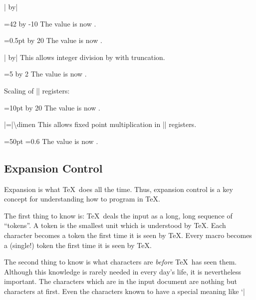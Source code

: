 \begin{command}{\multiply{}| by|}
\begin{codeexample}[]
=42
\multiply{} by -10
The value is now \the{}.
\end{codeexample}

\begin{codeexample}[]
=0.5pt
\multiply{} by 20
The value is now \the{}.
\end{codeexample}
\end{command}

\begin{command}{\divide{}| by|}
	This allows integer division by  with truncation.
\begin{codeexample}[]
=5
\divide{} by 2
The value is now \the{}.
\end{codeexample}

	Scaling of |\dimen| registers:
\begin{codeexample}[]
=10pt
\divide{} by 20
The value is now \the{}.
\end{codeexample}
\end{command}

\begin{command}{\dimen{}|=|\textbackslash dimen}
	This allows fixed point multiplication in |\dimen| registers.
\begin{codeexample}[]
=50pt
=0.6
The value is now \the{}.
\end{codeexample}
\end{command}


\subsection{Expansion Control}
\label{sec:expansion:control}
Expansion is what \TeX\ does all the time. Thus, expansion control is a key concept for understanding how to program in \TeX.

The first thing to know is: \TeX\ deals the input as a long, long sequence of ``tokens''. A token is the smallest unit which is understood by \TeX. Each character becomes a token the first time it is seen by \TeX. Every macro becomes a (single!) token the first time it is seen by \TeX.

The second thing to know is what characters are \emph{before} \TeX\ has seen them. Although this knowledge is rarely needed in every day's life, it is nevertheless important. The characters which are in the input document are nothing but characters at first. Even the characters known to have a special meaning like `|%

